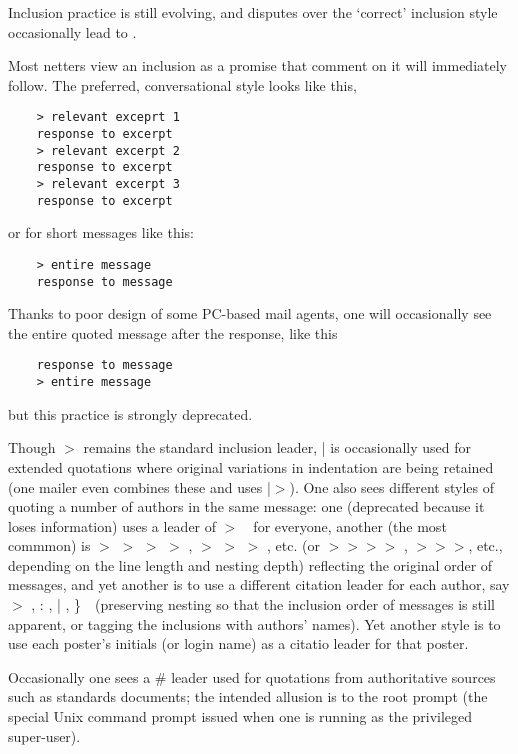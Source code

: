 Inclusion practice is still evolving, and disputes over the `correct' inclusion style occasionally lead to .

Most netters view an inclusion as a promise that comment on it will immediately follow. The preferred, conversational style looks like
this,

\begin{verbatim}
	> relevant exceprt 1
	response to excerpt
	> relevant excerpt 2
	response to excerpt
	> relevant excerpt 3
	response to excerpt
\end{verbatim}

or for short messages like this:

\begin{verbatim}
	> entire message
	response to message
\end{verbatim}

Thanks to poor design of some PC-based mail agents, one will occasionally see the entire quoted message after the response, like this

\begin{verbatim}
	response to message
	> entire message
\end{verbatim}

but this practice is strongly deprecated.

Though $>$ remains the standard inclusion leader, | is occasionally used for extended quotations where original variations in indentation
are being retained (one mailer even combines these and uses |$>$). One also sees different styles of quoting a number of authors in the
same message: one (deprecated because it loses information) uses a leader of $>$\ \ for everyone, another (the most commmon) is $>$ $>$
$>$ $>$ , $>$ $>$ $>$ , etc. (or $>$$>$$>$$>$ , $>$$>$$>$, etc., depending on the line length and nesting depth) reflecting the original
order of messages, and yet another is to use a different citation leader for each author, say $>$ , : , | , \}\ \ (preserving nesting so
that the inclusion order of messages is still apparent, or tagging the inclusions with authors' names). Yet another style is to use each
poster's initials (or login name) as a citatio leader for that poster.

Occasionally one sees a \# leader used for quotations from authoritative sources such as standards documents; the intended allusion is to
the root prompt (the special Unix command prompt issued when one is running as the privileged super-user).

